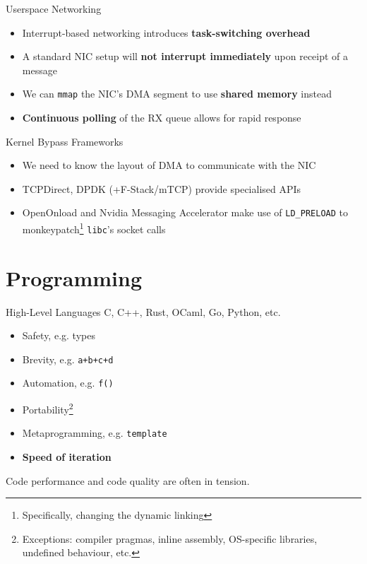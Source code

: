 \documentclass{beamer}
\newif\ifhasdiagram
\newcommand{\sectiondiagram}[1]{%
    \def\insertsdiagram{#1}%
    \hasdiagramtrue
}
\newcommand{\sectionquote}[1]{%
    \def\insertsquote{\small #1}%
}
\newcommand{\insertsdiagram}{}
\newcommand{\insertsquote}{}
\renewcommand{\insertsquote}{}
\renewcommand{\insertsdiagram}{}
\begin{document}
\begin{frame}{Userspace Networking}
	\begin{itemize}
		\item Interrupt-based networking introduces \textbf{task-switching overhead}
		\item A standard NIC setup will \textbf{not interrupt immediately} upon receipt of a message
		\item We can \texttt{mmap} the NIC's DMA segment to use \textbf{shared memory} instead
		\item \textbf{Continuous polling} of the RX queue allows for rapid response%
	\end{itemize}

	\begin{block}{Kernel Bypass Frameworks}
		\begin{itemize}
			\item We need to know the layout of DMA to communicate with the NIC
			\item TCPDirect, DPDK (+F-Stack/mTCP) provide specialised APIs
			\item OpenOnload and Nvidia Messaging Accelerator make use of \texttt{LD\_PRELOAD} to monkeypatch\footnote{Specifically, changing the dynamic linking} \texttt{libc}'s socket calls
		\end{itemize}
	\end{block}
\end{frame}


\sectiondiagram{program}
\sectionquote{``There is no science apart from the general. \\ It may even be said that the very object of the exact sciences is to spare us these direct verifications.'' Henri Poincaré}
\section{Programming}

\begin{frame}{High-Level Languages}
	C, C++, Rust, OCaml, Go, Python, etc.
	\begin{itemize}
		\item Safety, e.g. types %
		\item Brevity, e.g. \texttt{a+b+c+d}
		\item Automation, e.g. \texttt{f()}
		\item Portability\footnote{Exceptions: compiler pragmas, inline assembly, OS-specific libraries, undefined behaviour, etc.}
		\item Metaprogramming, e.g. \texttt{template}
		\item \textbf{Speed of iteration}
	\end{itemize}

	Code performance and code quality are often in tension.
\end{frame}
\end{document}
